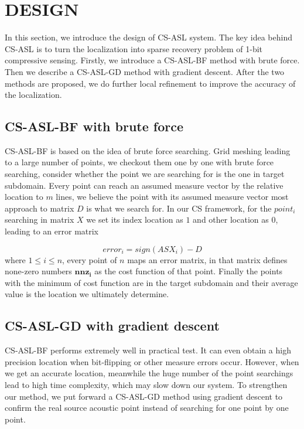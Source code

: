 
\section{DESIGN}

In this section,  we introduce the design of CS-ASL system. The key idea behind CS-ASL is to turn the localization into sparse recovery problem of 1-bit compressive sensing.  
Firstly, we introduce a CS-ASL-BF method with brute force. Then we describe a CS-ASL-GD method with gradient descent. After the two methods are proposed, we do further local refinement to improve the accuracy of the localization.

\subsection{CS-ASL-BF with brute force}
CS-ASL-BF is based on the idea of brute force searching. Grid meshing leading to a large number of points, we checkout them one by one with brute force searching, consider whether the point we are searching for is the one in target subdomain. Every point can reach an assumed measure vector by the relative location to $m$ lines, we believe the point with its assumed measure vector most approach to matrix $D$ is what we search for. In our CS framework, for the ${poin{t_i}}$ searching in matrix $X$ we set its index location as $1$ and other location as $0$, leading to an error matrix

\begin{equation}\label{eq:eps}
error_i=sign(ASX_i)-D
\end{equation}where $1\leq i \leq n$, every point of $n$ maps an error matrix, in that matrix defines none-zero numbers $\bm{nnz{_i}}$ as the cost function of that point. Finally the points with the minimum of cost function are in the target subdomain and their average value is the location we ultimately determine.



\subsection{CS-ASL-GD with gradient descent}
CS-ASL-BF performs extremely well in practical test. It can even obtain a high precision location when bit-flipping or other measure errors occur.
However, when we get an accurate location, meanwhile the huge number of the point searchings lead to high time complexity, which may slow down our system. To strengthen our method, we put forward a CS-ASL-GD method using gradient descent to confirm the real source acoustic point instead of searching for one point by one point.

